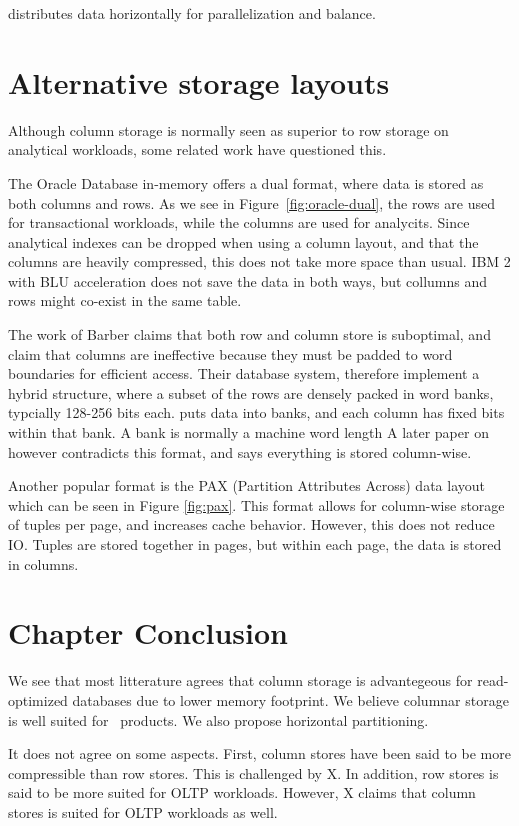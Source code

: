  distributes data horizontally for parallelization and balance.


\section{Alternative storage layouts}
\label{sec:Alternative storage layouts}
Although column storage is normally seen as superior to row storage on analytical workloads, some related work have questioned this.

The Oracle Database in-memory \cite{Lahiri2015-mz} offers a dual format, where data is stored as both columns and rows. As we see in Figure~\ref{fig:oracle-dual}, the rows are used for transactional workloads, while the columns are used for analycits. Since analytical indexes can be dropped when using a column layout, and that the columns are heavily compressed, this does not take more space than usual. IBM 2 with BLU acceleration \cite{Raman2013-em} does not save the data in both ways, but collumns and rows might co-exist in the same table.

The work of Barber \ea \cite{Barber2012-xt} claims that both row and column store is suboptimal, and claim that columns are ineffective because they must be padded to word boundaries for efficient access. Their database system,  therefore implement a hybrid structure, where a subset of the rows are densely packed in word banks, typcially 128-256 bits each.  puts data into banks, and each column has fixed bits within that bank. A bank is normally a machine word length \cite{Johnson2008-cp} A later paper on  \cite{Raman2013-em} however contradicts this format, and says everything is stored column-wise.

Another popular format is the PAX (Partition Attributes Across) data layout \cite{Holloway2008-rr, Bjorklund2011-wh} which can be seen in Figure \ref{fig:pax}. This format allows for column-wise storage of tuples per page, and increases cache behavior. However, this does not reduce IO. Tuples are stored together in pages, but within each page, the data is stored in columns.

\section{Chapter Conclusion}
\label{sec:Chapter Conclusion}
We see that most litterature agrees that column storage is advantegeous for read-optimized databases due to lower memory footprint. We believe columnar storage is well suited for \bd~products. We also propose horizontal partitioning.

It does not agree on some aspects. First, column stores have been said to be more compressible than row stores. This is challenged by X. In addition, row stores is said to be more suited for OLTP workloads. However, X claims that column stores is suited for OLTP workloads as well.


